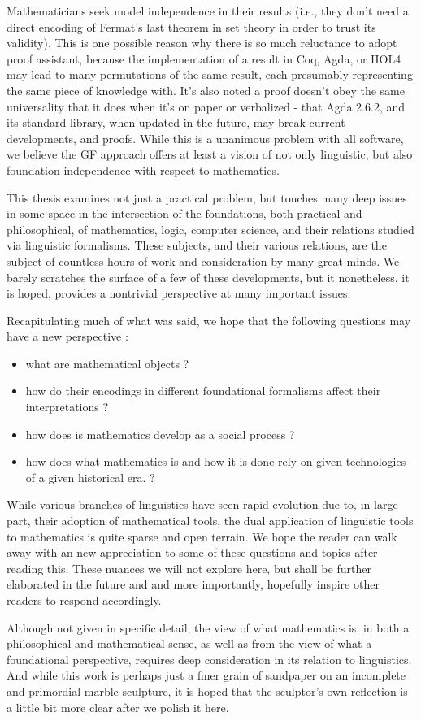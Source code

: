 Mathematicians seek model independence in their results (i.e., they don't need a
direct encoding of Fermat's last theorem in set theory in order to trust its
validity). This is one possible reason why there is so much reluctance to adopt
proof assistant, because the implementation of a result in Coq, Agda, or HOL4
may lead to many permutations of the same result, each presumably representing
the same piece of knowledge with. It's also noted a proof doesn't obey the same
universality that it does when it's on paper or verbalized - that Agda 2.6.2,
and its standard library, when updated in the future, may break current
developments, and proofs. While this is a unanimous problem with all software,
we believe the GF approach offers at least a vision of not only linguistic, but
also foundation independence with respect to mathematics.

This thesis examines not just a practical problem, but touches many deep issues in
some space in the intersection of the foundations, both practical and
philosophical, of mathematics, logic, computer science, and their relations
studied via linguistic formalisms. These subjects, and their various relations,
are the subject of countless hours of work and consideration by many great
minds. We barely scratches the surface of a few of these developments,
but it nonetheless, it is hoped, provides a nontrivial perspective at many
important issues.

Recapitulating much of what was said, we hope that the following questions may
have a new perspective :

\begin{itemize}

\item what are mathematical objects ?
\item how do their encodings in different foundational formalisms affect their
  interpretations ?
\item how does is mathematics develop as a social process ?
\item how does what mathematics is and how it is done rely on given technologies
  of a given historical era. ?
  
\end{itemize}

While various branches of linguistics have seen rapid evolution due to, in large
part, their adoption of mathematical tools, the dual application of linguistic
tools to mathematics is quite sparse and open terrain. We hope the reader can
walk away with an new appreciation to some of these questions and topics after
reading this. These nuances we will not explore here, but shall be further
elaborated in the future and and more importantly, hopefully inspire other
readers to respond accordingly.

Although not given in specific detail, the view of what mathematics is, in both
a philosophical and mathematical sense, as well as from the view of what a
foundational perspective, requires deep consideration in its relation to
linguistics. And while this work is perhaps just a finer grain of sandpaper on
an incomplete and primordial marble sculpture, it is hoped that the sculptor's
own reflection is a little bit more clear after we polish it here.
